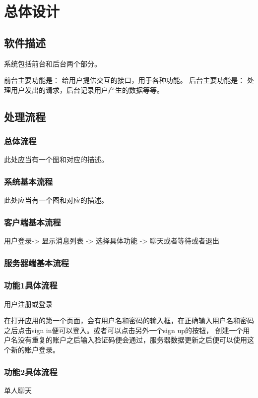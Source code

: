 \chapter{总体设计}
\section{软件描述}
系统包括前台和后台两个部分。

前台主要功能是：
给用户提供交互的接口，用于各种功能。
后台主要功能是：
处理用户发出的请求，后台记录用户产生的数据等等。

\section{处理流程}
\subsection{总体流程}
此处应当有一个图和对应的描述。

\subsection{系统基本流程}
此处应当有一个图和对应的描述。

\subsection{客户端基本流程}
用户登录-> 显示消息列表 -> 选择具体功能 -> 聊天或者等待或者退出

\subsection{服务器端基本流程}


\subsection{功能1具体流程}

用户注册或登录

在打开应用的第一个页面，会有用户名和密码的输入框，在正确输入用户名和密码之后点击sign in便可以登入。或者可以点击另外一个sign up的按钮，
创建一个用户名没有重复的账户之后输入验证码便会通过，服务器数据更新之后便可以使用这个新的账户登录。


\subsection{功能2具体流程}

单人聊天

